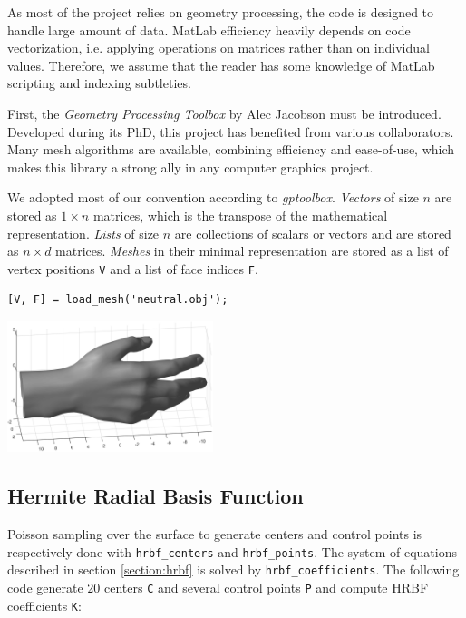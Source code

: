 \documentclass[a4paper,10pt]{article}
\begin{document}
\begin{multicols}{2}
As most of the project relies on geometry processing, the code is designed to handle large amount of data.
MatLab efficiency heavily depends on code vectorization, i.e. applying operations on matrices rather than on individual values.
Therefore, we assume that the reader has some knowledge of MatLab scripting and indexing subtleties.

First, the \emph{Geometry Processing Toolbox}\cite{gptoolbox} by Alec Jacobson must be introduced.
Developed during its PhD, this project has benefited from various collaborators.
Many mesh algorithms are available, combining efficiency and ease-of-use, which makes this library a strong ally in any computer graphics project.

We adopted most of our convention according to \emph{gptoolbox}.
\emph{Vectors} of size $n$ are stored as $1 \times n$ matrices, which is the transpose of the mathematical representation.
\emph{Lists} of size $n$ are collections of scalars or vectors and are stored as $n \times d$ matrices.
\emph{Meshes} in their minimal representation are stored as a list of vertex positions \lstinline!V! and a list of face indices \lstinline!F!.

\begin{lstlisting}
[V, F] = load_mesh('neutral.obj');
\end{lstlisting}

\begin{center}
\includegraphics[width=0.45\textwidth]{figs/demo_mesh}
\end{center}


\subsection{Hermite Radial Basis Function}

Poisson sampling over the surface to generate centers and control points is respectively done with \lstinline!hrbf_centers! and \lstinline!hrbf_points!.
The system of equations described in section \ref{section:hrbf} is solved by \lstinline!hrbf_coefficients!.
The following code generate $20$ centers \lstinline!C! and several control points \lstinline!P! and compute HRBF coefficients \lstinline!K!:


\end{multicols}
\end{document}
